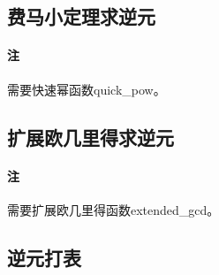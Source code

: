 \subsection{费马小定理求逆元}

\paragraph{注} 需要快速幂函数quick\_pow。



\subsection{扩展欧几里得求逆元}

\paragraph{注} 需要扩展欧几里得函数extended\_gcd。



\subsection{逆元打表}

